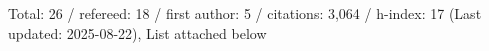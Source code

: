 Total: 26 / refereed: 18 / first author: 5 / citations: 3,064 / h-index: 17 (Last updated: 2025-08-22), List attached below